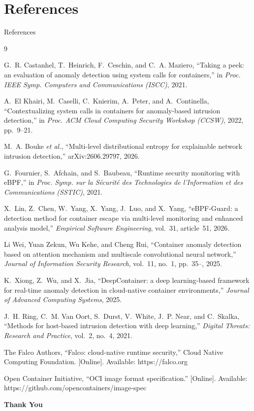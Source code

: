 \documentclass[aspectratio=169, 11pt]{beamer}
\begin{document}
\section{References}
\begin{frame}[allowframebreaks]{References}
\scriptsize
\begin{thebibliography}{9}

G.~R. Castanhel, T.~Heinrich, F.~Ceschin, and C.~A. Maziero,
``Taking a peek: an evaluation of anomaly detection using system calls
for containers,''
in \emph{Proc. IEEE Symp. Computers and Communications (ISCC)}, 2021.

A.~El Khairi, M.~Caselli, C.~Knierim, A.~Peter, and A.~Continella,
``Contextualizing system calls in containers for anomaly-based intrusion
detection,''
in \emph{Proc. ACM Cloud Computing Security Workshop (CCSW)}, 2022, pp.~9--21.

M.~A. Bouke \emph{et al.},
``Multi-level distributional entropy for explainable network intrusion
detection,'' arXiv:2606.29797, 2026.

G.~Fournier, S.~Afchain, and S.~Baubeau,
``Runtime security monitoring with eBPF,''
in \emph{Proc. Symp. sur la Sécurité des Technologies de l'Information et
des Communications (SSTIC)}, 2021.

X.~Lin, Z.~Chen, W.~Yang, X.~Yang, J.~Luo, and X.~Yang,
``eBPF-Guard: a detection method for container escape via multi-level
monitoring and enhanced analysis model,''
\emph{Empirical Software Engineering}, vol.~31, article~51, 2026.

Li Wei, Yuan Zekun, Wu Kehe, and Cheng Rui,
``Container anomaly detection based on attention mechanism and multiscale
convolutional neural network,''
\emph{Journal of Information Security Research}, vol.~11, no.~1, pp.~35--, 2025.

K.~Xiong, Z.~Wu, and X.~Jia,
``DeepContainer: a deep learning-based framework for real-time anomaly
detection in cloud-native container environments,''
\emph{Journal of Advanced Computing Systems}, 2025.

J.~H. Ring, C.~M. Van Oort, S.~Durst, V.~White, J.~P. Near, and C.~Skalka,
``Methods for host-based intrusion detection with deep learning,''
\emph{Digital Threats: Research and Practice}, vol.~2, no.~4, 2021.

The Falco Authors,
``Falco: cloud-native runtime security,''
Cloud Native Computing Foundation. [Online]. Available: https://falco.org

Open Container Initiative,
``OCI image format specification.'' [Online].
Available: https://github.com/opencontainers/image-spec

\end{thebibliography}
\end{frame}

\begin{frame}
    \centering
    {\Huge \textbf{\textcolor{amritaMaroon}{Thank You}}}
\end{frame}
\end{document}
